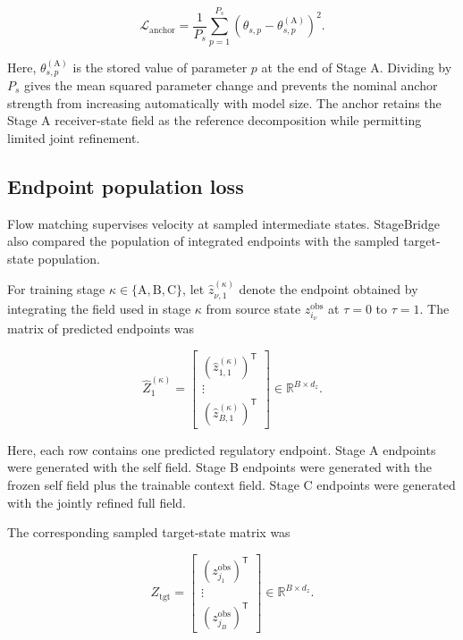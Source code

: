 \begin{equation}
\mathcal{L}_{\mathrm{anchor}}
=
\frac{1}{P_s}
\sum_{p=1}^{P_s}
\left(
\theta_{s,p}
-
\theta_{s,p}^{(\mathrm{A})}
\right)^2.
\label{appb-eq:methods-stage-c-anchor}
\end{equation}

Here, \(\theta_{s,p}^{(\mathrm{A})}\) is the stored value of parameter \(p\)
at the end of Stage A. Dividing by \(P_s\) gives the mean squared parameter
change and prevents the nominal anchor strength from increasing automatically
with model size. The anchor retains the Stage A receiver-state field as the
reference decomposition while permitting limited joint refinement.

\subsection{Endpoint population loss}
\label{appb-sec:methods-endpoint-loss}

Flow matching supervises velocity at sampled intermediate states. StageBridge
also compared the population of integrated endpoints with the sampled
target-state population.

For training stage
\(\kappa\in\{\mathrm{A},\mathrm{B},\mathrm{C}\}\), let
\(\widehat{z}_{\nu,1}^{(\kappa)}\) denote the endpoint obtained by integrating
the field used in stage \(\kappa\) from source state
\(z_{i_\nu}^{\mathrm{obs}}\) at \(\tau=0\) to \(\tau=1\). The matrix of
predicted endpoints was

\begin{equation}
\widehat{Z}_1^{(\kappa)}
=
\begin{bmatrix}
\left(\widehat{z}_{1,1}^{(\kappa)}\right)^{\mathsf T}\\
\vdots\\
\left(\widehat{z}_{B,1}^{(\kappa)}\right)^{\mathsf T}
\end{bmatrix}
\in
\mathbb{R}^{B\times d_z}.
\label{appb-eq:methods-predicted-endpoint-matrix}
\end{equation}

Here, each row contains one predicted regulatory endpoint. Stage A endpoints
were generated with the self field. Stage B endpoints were generated with the
frozen self field plus the trainable context field. Stage C endpoints were
generated with the jointly refined full field.

The corresponding sampled target-state matrix was

\begin{equation}
Z_{\mathrm{tgt}}
=
\begin{bmatrix}
\left(z_{j_1}^{\mathrm{obs}}\right)^{\mathsf T}\\
\vdots\\
\left(z_{j_B}^{\mathrm{obs}}\right)^{\mathsf T}
\end{bmatrix}
\in
\mathbb{R}^{B\times d_z}.
\label{appb-eq:methods-training-target-matrix}
\end{equation}

